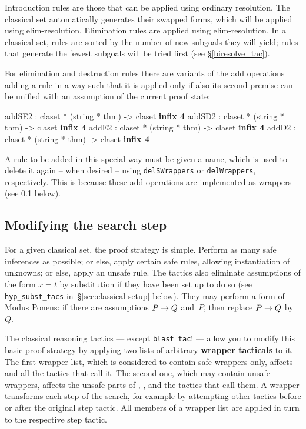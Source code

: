 Introduction rules are those that can be applied using ordinary resolution.
The classical set automatically generates their swapped forms, which will
be applied using elim-resolution.  Elimination rules are applied using
elim-resolution.  In a classical set, rules are sorted by the number of new
subgoals they will yield; rules that generate the fewest subgoals will be
tried first (see \S\ref{biresolve_tac}).

For elimination and destruction rules there are variants of the add operations
adding a rule in a way such that it is applied only if also its second premise
can be unified with an assumption of the current proof state:
\begin{ttbox}
addSE2      : claset * (string * thm) -> claset           \hfill{\bf infix 4}
addSD2      : claset * (string * thm) -> claset           \hfill{\bf infix 4}
addE2       : claset * (string * thm) -> claset           \hfill{\bf infix 4}
addD2       : claset * (string * thm) -> claset           \hfill{\bf infix 4}
\end{ttbox}
\begin{warn}
  A rule to be added in this special way must be given a name, which is used 
  to delete it again -- when desired -- using \texttt{delSWrappers} or 
  \texttt{delWrappers}, respectively. This is because these add operations
  are implemented as wrappers (see \ref{sec:modifying-search} below).
\end{warn}


\subsection{Modifying the search step}
\label{sec:modifying-search}
For a given classical set, the proof strategy is simple.  Perform as many safe
inferences as possible; or else, apply certain safe rules, allowing
instantiation of unknowns; or else, apply an unsafe rule.  The tactics also
eliminate assumptions of the form $x=t$ by substitution if they have been set
up to do so (see \texttt{hyp_subst_tacs} in~\S\ref{sec:classical-setup} below).
They may perform a form of Modus Ponens: if there are assumptions $P\rightarrow Q$
and~$P$, then replace $P\rightarrow Q$ by~$Q$.

The classical reasoning tactics --- except \texttt{blast_tac}! --- allow
you to modify this basic proof strategy by applying two lists of arbitrary 
{\bf wrapper tacticals} to it. 
The first wrapper list, which is considered to contain safe wrappers only, 
affects  and all the tactics that call it.  
The second one, which may contain unsafe wrappers, affects the unsafe parts
of , , and the tactics that call them.
A wrapper transforms each step of the search, for example 
by attempting other tactics before or after the original step tactic. 
All members of a wrapper list are applied in turn to the respective step tactic.

